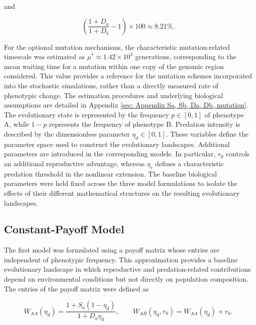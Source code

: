 and

\begin{equation}
    \left(\frac{1+D_a}{1+D_b}-1\right)\times100
    \approx 8.21\%.
    \label{eq:relativeDead}
\end{equation}

For the optional mutation mechanisms, the characteristic mutation-related timescale was estimated as $\mu^*\approx1.42\times10^3$ generations, corresponding to the mean waiting time for a mutation within one copy of the genomic region considered. This value provides a reference for the mutation schemes incorporated into the stochastic simulations, rather than a directly measured rate of phenotypic change. The estimation procedures and underlying biological assumptions are detailed in Appendix \ref{sec: Appendix Sa, Sb, Da, Db, mutation}.\\

The evolutionary state is represented by the frequency $p\in[0,1]$ of phenotype A, while $1-p$ represents the frequency of phenotype B. Predation intensity is described by the dimensionless parameter $\eta_d\in[0,1]$. These variables define the parameter space used to construct the evolutionary landscapes. Additional parameters are introduced in the corresponding models. In particular, $r_0$ controls an additional reproductive advantage, whereas $\eta_c$ defines a characteristic predation threshold in the nonlinear extension. The baseline biological parameters were held fixed across the three model formulations to isolate the effects of their different mathematical structures on the resulting evolutionary landscapes. 


\subsection{Constant-Payoff Model}
\label{sec:constant_payoff_methodology}

The first model was formulated using a payoff matrix whose entries are independent of phenotypic frequency. This approximation provides a baseline evolutionary landscape in which reproductive and predation-related contributions depend on environmental conditions but not directly on population composition. The entries of the payoff matrix were defined as

\begin{equation}
W_{AA}(\eta_d)=\frac{1+S_a(1-\eta_d)}{1+D_a\eta_d},
\qquad
W_{AB}(\eta_d,r_0)=W_{AA}(\eta_d)+r_0.
\label{eq:constant_payoff_A}
\end{equation}

